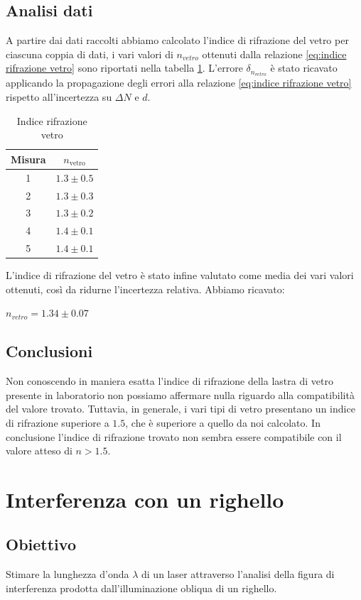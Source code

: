 \documentclass[a4paper]{article}
\begin{document}
\subsection{Analisi dati}
A partire dai dati raccolti abbiamo calcolato l'indice di rifrazione del vetro per ciascuna coppia di dati, i vari valori di $n_{vetro}$ ottenuti dalla relazione \ref{eq:indice rifrazione vetro} sono riportati nella tabella \ref{tab:indice_rifrazione_vetro}. L'errore $\delta_{n_{vetro}}$ è stato ricavato applicando la propagazione degli errori alla relazione \ref{eq:indice rifrazione vetro} rispetto all'incertezza su $\Delta N$ e $d$.
\begin{table}[h!]
\centering
\begin{tabular}{|c|c|}
\hline
\textbf{Misura} & \( n_{\text{vetro}} \) \\
\hline
1 & \( 1.3 \pm 0.5 \) \\
2 & \( 1.3 \pm 0.3 \) \\
3 & \( 1.3 \pm 0.2 \) \\
4 & \( 1.4 \pm 0.1 \) \\
5 & \( 1.4 \pm 0.1 \) \\
\hline
\end{tabular}
\caption{Indice rifrazione vetro}
\label{tab:indice_rifrazione_vetro}
\end{table}
L'indice di rifrazione del vetro è stato infine valutato come media dei vari valori ottenuti, così da ridurne l'incertezza relativa. Abbiamo ricavato:
\begin{center}
    $n_{vetro}=1.34 \pm 0.07$
\end{center}
\subsection{Conclusioni}
Non conoscendo in maniera esatta l'indice di rifrazione della lastra di vetro presente in laboratorio non possiamo affermare nulla riguardo alla compatibilità del valore trovato. Tuttavia, in generale, i vari tipi di vetro presentano un indice di rifrazione superiore a $1.5$, che è superiore a quello da noi calcolato. In conclusione l'indice di rifrazione trovato non sembra essere compatibile con il valore atteso di $n>1.5$. 
\section{Interferenza con un righello}
\subsection{Obiettivo}
Stimare la lunghezza d'onda $\lambda$ di un laser attraverso l'analisi della figura di interferenza prodotta dall'illuminazione obliqua di un righello. 
\end{document}
